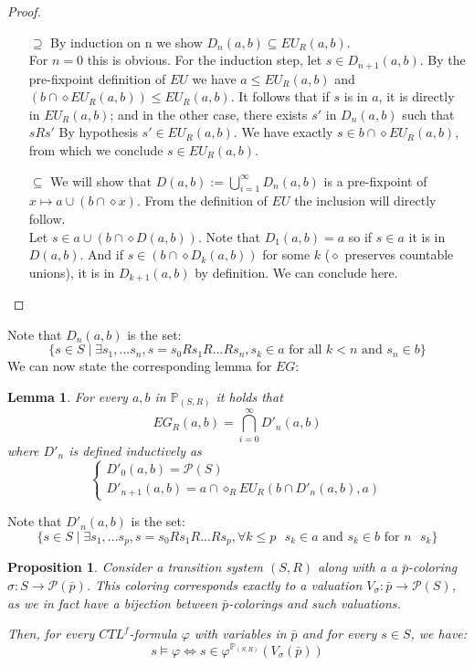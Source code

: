 \documentclass[11pt]{article}
\newtheorem{proposition}[definition]{Proposition}
\newtheorem{lemma}[definition]{Lemma}
\begin{document}
\begin{proof}
    \begin{itemize}
        \item[$\supseteq$] By induction on n we show $D_n(a,b) \subseteq EU_R(a,b)$.\\ For $n=0$ this is obvious. For the induction step, let $s\in D_{n+1}(a,b)$. By the pre-fixpoint definition of $EU$ we have $a\leq EU_R(a,b)$ and $(b\cap\diamond EU_R(a,b))\leq EU_R(a,b)$. It follows that if $s$ is in $a$, it is directly in $EU_R(a,b)$; and in the other case, there exists $s'$ in $D_n(a,b)$ such that $sRs'$ By hypothesis $s'\in EU_R(a,b)$. We have exactly $s\in b\cap\diamond EU_R(a,b)$, from which we conclude $s\in EU_R(a,b)$.
        \item[$\subseteq$] We will show that $D(a,b) := \bigcup_{i=1}^{\infty}D_n(a,b)$ is a pre-fixpoint of $x \mapsto a \cup (b \cap \diamond x)$. From the definition of $EU$ the inclusion will directly follow.\\ Let $s\in a \cup (b \cap \diamond D(a,b))$. Note that $D_1(a,b)=a$ so if $s\in a$ it is in $D(a,b)$. And if $s\in (b \cap \diamond D_k(a,b))$ for some $k$ ($\diamond$ preserves countable unions), it is in $D_{k+1}(a,b)$ by definition. We can conclude here.
    \end{itemize}
\end{proof}
Note that $D_n(a,b)$ is the set: \[\{s\in S\mid \exists s_1,...s_n, s=s_0Rs_1R...Rs_n, s_k\in a \mbox{ for all } k<n \mbox{ and } s_n \in b\}\]
We can now state the corresponding lemma for $EG$:
\begin{lemma}\label{EG_as_inters}
    For every $a,b$ in $\mathbb{P}_{(S,R)}$ it holds that \[EG_R(a,b)=\bigcap_{i=0}^{\infty}D'_n(a,b)\] where $D'_n$ is defined inductively as
        \begin{equation*}
            \begin{cases}
                D'_0(a,b)=\mathcal{P}(S)\\
                D'_{n+1}(a,b)=a\cap\diamond_REU_R(b\cap D'_n(a,b),a)
            \end{cases}
        \end{equation*}
\end{lemma}

Note that $D'_n(a,b)$ is the set: \[\{s\in S\mid \exists s_1,...s_p, s=s_0Rs_1R...Rs_p,\forall k\leq p \mbox{ } s_k\in a \mbox{ and } s_k \in b \mbox{ for }n\mbox{ }s_k\}\]

\begin{proposition}\label{equiv_complex_alg}
    Consider a transition system $(S,R)$ along with a a $\bar{p}$-coloring $\sigma : S \to \mathcal{P}(\bar{p})$. This coloring corresponds exactly to a valuation $V_\sigma:\bar{p}\to \mathcal{P}(S)$, as we in fact have a bijection between $\bar{p}$-colorings and such valuations.

    Then, for every $CTL^f$-formula $\varphi$ with variables in $\bar{p}$ and for every $s\in S$, we have: \[s\models\varphi \Longleftrightarrow s\in\varphi^{\mathbb{P}_{(S,R)}}(V_\sigma(\bar{p}))\]
\end{proposition}
\end{document}
